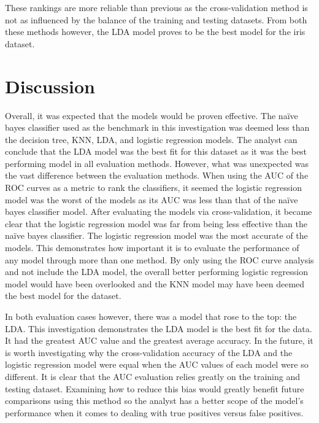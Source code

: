 \documentclass[journal]{IEEEtran}
\begin{document}
These rankings are more reliable than previous as the cross-validation method is not as influenced by the balance of the training and testing datasets. From both these methods however, the LDA model proves to be the best model for the iris dataset. 

\section{Discussion}
\label{sec:discussion}

Overall, it was expected that the models would be proven effective. The naïve bayes classifier used as the benchmark in this investigation was deemed less than the decision tree, KNN, LDA, and logistic regression models. The analyst can conclude that the LDA model was the best fit for this dataset as it was the best performing model in all evaluation methods. However, what was unexpected was the vast difference between the evaluation methods. When using the AUC of the ROC curves as a metric to rank the classifiers, it seemed the logistic regression model was the worst of the models as its AUC was less than that of the naïve bayes classifier model. After evaluating the models via cross-validation, it became clear that the logistic regression model was far from being less effective than the naïve bayes classifier. The logistic regression model was the most accurate of the models. This demonstrates how important it is to evaluate the performance of any model through more than one method. By only using the ROC curve analysis and not include the LDA model, the overall better performing logistic regression model would have been overlooked and the KNN model may have been deemed the best model for the dataset. 

In both evaluation cases however, there was a model that rose to the top: the LDA. This investigation demonstrates the LDA model is the best fit for the data. It had the greatest AUC value and the greatest average accuracy. In the future, it is worth investigating why the cross-validation accuracy of the LDA and the logistic regression model were equal when the AUC values of each model were so different. It is clear that the AUC evaluation relies greatly on the training and testing dataset. Examining how to reduce this bias would greatly benefit future comparisons using this method so the analyst has a better scope of the model's performance when it comes to dealing with true positives versus false positives. 

\vspace{30px}
\end{document}
